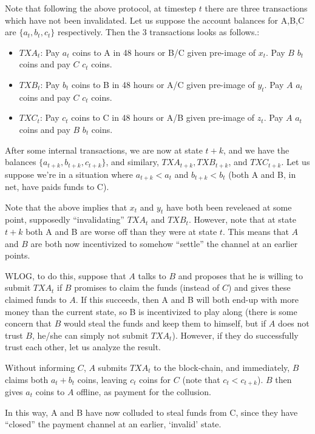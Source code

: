 \documentclass[12pt]{exam}
\begin{document}
\begin{questions}
\begin{solution}
  Note that following the above protocol, at timestep $t$ there are three transactions which have not been invalidated. Let us suppose the account balances for A,B,C are $\{a_t,b_t,c_t\}$ respectively. Then the 3 transactions looks as follows.:
  \begin{itemize}
    \item $TXA_t$: Pay $a_t$ coins to A in 48 hours or B/C given pre-image of $x_t$. Pay $B$ $b_t$ coins and pay $C$ $c_t$ coins.
    \item $TXB_t$: Pay $b_t$ coins to B in 48 hours or A/C given pre-image of $y_t$. Pay $A$ $a_t$ coins and pay $C$ $c_t$ coins.
    \item $TXC_t$: Pay $c_t$ coins to C in 48 hours or A/B given pre-image of $z_t$. Pay $A$ $a_t$ coins and pay $B$ $b_t$ coins.
  \end{itemize}
  After some internal transactions, we are now at state $t+k$, and we have the balances $\{a_{t+k}, b_{t+k}, c_{t+k}\}$, and similary, $TXA_{t+k},TXB_{t+k}$, and $TXC_{t+k}$. Let us suppose we're in a situation where $a_{t+k} < a_t$ and $b_{t+k} < b_t$ (both A and B, in net, have paids funds to C).

  Note that the above implies that $x_t$ and $y_t$ have both been reveleaed at some point, supposedly ``invalidating'' $TXA_t$ and $TXB_t$. However, note that at state $t+k$ both A and B are worse off than they were at state $t$. This means that $A$ and $B$ are both now incentivized to somehow ``settle'' the channel at an earlier points.


  WLOG, to do this, suppose that $A$ talks to $B$ and proposes that he is willing to submit $TXA_t$ if $B$ promises to claim the funds (instead of $C$) and gives these claimed funds to $A$. If this succeeds, then A and B will both end-up with more money than the current state, so B is incentivized to play along (there is some concern that $B$ would steal the funds and keep them to himself, but if $A$ does not trust $B$, he/she can simply not submit $TXA_t$). However, if they do successfully trust each other, let us analyze the result.

  Without informing $C$, $A$ submits $TXA_t$ to the block-chain, and immediately, $B$ claims both $a_t + b_t$ coins, leaving $c_t$ coins for $C$ (note that $c_t < c_{t+k}$). $B$ then gives $a_t$ coins to $A$ offline, as payment for the collusion.

  In this way, A and B have now colluded to steal funds from C, since they have ``closed'' the payment channel at an earlier, `invalid' state.


\end{solution}
\end{questions}
\end{document}
